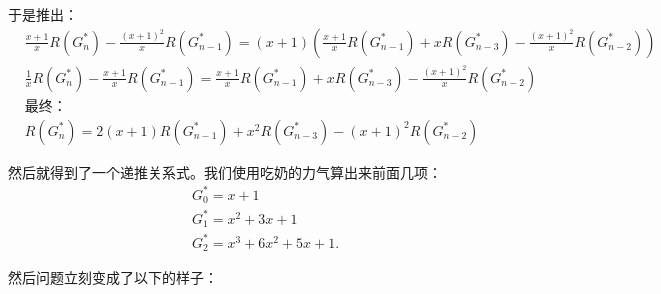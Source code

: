 \documentclass[oneside]{book}
\theoremstyle{definition}
\begin{document}
于是推出：
\[
\begin{aligned}
	&\frac{x+1}{x} R(G_n^*)- \frac{(x+1)^2}{x} R(G_{n-1}^*) =(x+1)\left( \frac{x+1}{x} R(G_{n-1}^*) + x R(G_{n-3}^*) - \frac{(x+1)^2}{x} R(G_{n-2}^*)\right)\\
	&\frac{1}{x} R(G_n^*)- \frac{x+1}{x} R(G_{n-1}^*) =\frac{x+1}{x} R(G_{n-1}^*) + x R(G_{n-3}^*) - \frac{(x+1)^2}{x} R(G_{n-2}^*)\\
	&\text{最终：}\\
	&R(G_n^*)= 2(x+1)R(G_{n-1}^*) + x^2 R(G_{n-3}^*) - (x+1)^2R(G_{n-2}^*)
\end{aligned}
\]

然后就得到了一个递推关系式。我们使用吃奶的力气算出来前面几项：
\[
\begin{aligned}
	&G_0^*=x+1\\
	&G_1^*=x^2+3x+1\\
	&G_2^*=x^3+6x^2+5x+1.
\end{aligned}\]

然后问题立刻变成了以下的样子：
\end{document}
